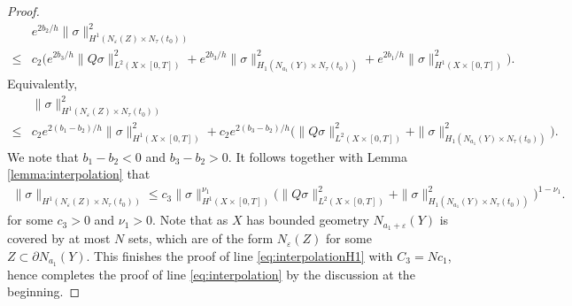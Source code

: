 \documentclass[10pt,a4paper]{amsart}
\begin{document}
\begin{proof}
	\begin{align*}
		&e^{2b_2/h}\|\sigma\|_{H^1(N_\varepsilon(Z)\times N_\tau(t_0))}^2\\ \leq& c_2\Big(e^{2b_3/h}\|Q\sigma\|^2_{L^2(X\times[0,T])}+e^{2b_3/h}\|\sigma\|^2_{H_1(N_{a_1}(Y)\times N_\tau(t_0))}+e^{2b_1/h}\|\sigma\|^2_{H^1(X\times[0,T])}\Big).
	\end{align*}
	Equivalently,
	\begin{align*}
		&\|\sigma\|_{H^1(N_\varepsilon(Z)\times N_\tau(t_0))}^2\\ \leq& c_2e^{2(b_1-b_2)/h}\|\sigma\|^2_{H^1(X\times[0,T])}+c_2e^{2(b_3-b_2)/h}\Big(\|Q\sigma\|^2_{L^2(X\times[0,T])}+\|\sigma\|^2_{H_1(N_{a_1}(Y)\times N_\tau(t_0))}\Big).
	\end{align*}
	We note that $b_1-b_2<0$ and $b_3-b_2>0$. It follows together with Lemma \ref{lemma:interpolation} that
	\begin{align*}
		\|\sigma\|_{H^1(N_\varepsilon(Z)\times N_\tau(t_0))}\leq c_3\|\sigma\|^{\nu_1}_{H^1(X\times[0,T])}\Big(\|Q\sigma\|^2_{L^2(X\times[0,T])}+\|\sigma\|^2_{H_1(N_{a_1}(Y)\times N_\tau(t_0))}\Big)^{1-\nu_1}.
	\end{align*}
	for some $c_3>0$ and $\nu_1>0$. Note that as $X$ has bounded geometry $N_{a_1+\varepsilon}(Y)$ is covered by at most $N$ sets, which are of the form $N_\varepsilon(Z)$ for some $Z\subset\partial N_{a_1}(Y)$. This finishes the proof of line \eqref{eq:interpolationH1} with $C_3=Nc_1$, hence completes the proof of line \eqref{eq:interpolation} by the discussion at the beginning.	
\end{proof}
\end{document}
